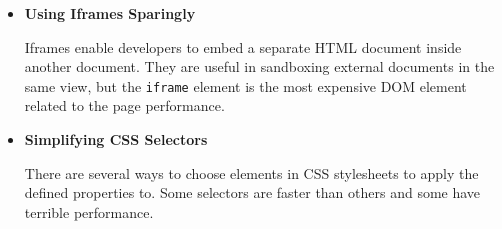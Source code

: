 \begin{itemize}
\item \textbf{Using Iframes Sparingly}

  Iframes enable developers to embed a separate HTML document inside
  another document. They are useful in sandboxing external documents
  in the same view, but the \texttt{iframe} element is the most
  expensive DOM element related to the page performance.

\item \textbf{Simplifying CSS Selectors}

  There are several ways to choose elements in CSS stylesheets to
  apply the defined properties to. Some selectors are faster than
  others and some have terrible performance.

\end{itemize}
